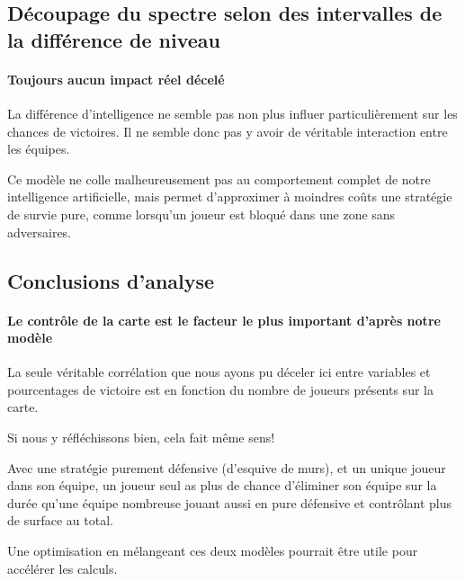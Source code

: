 \subsection{Découpage du spectre selon des intervalles de la différence de niveau}
\paragraph{Toujours aucun impact réel décelé}
La différence d'intelligence ne semble pas non plus influer particulièrement sur les chances de victoires. Il ne semble donc pas y avoir de véritable interaction entre les équipes.


\begin{info}
	Ce modèle ne colle malheureusement pas au comportement complet de notre intelligence artificielle, mais permet d'approximer à moindres coûts une stratégie de survie pure, comme lorsqu'un joueur est bloqué dans une zone sans adversaires.
\end{info}

\subsection{Conclusions d'analyse}
\paragraph{Le contrôle de la carte est le facteur le plus important d'après notre modèle}
La seule véritable corrélation que nous ayons pu déceler ici entre variables et pourcentages de victoire est en fonction du nombre de joueurs présents sur la carte.

Si nous y réfléchissons bien, cela fait même sens! 

\begin{result}
	Avec une stratégie purement défensive (d'esquive de murs), et un unique joueur dans son équipe, un joueur seul as plus de chance d'éliminer son équipe sur la durée qu'une équipe nombreuse jouant aussi en pure défensive et contrôlant plus de surface au total.
\end{result}


\begin{info}
	Une optimisation en mélangeant ces deux modèles pourrait être utile pour accélérer les calculs. 
\end{info}